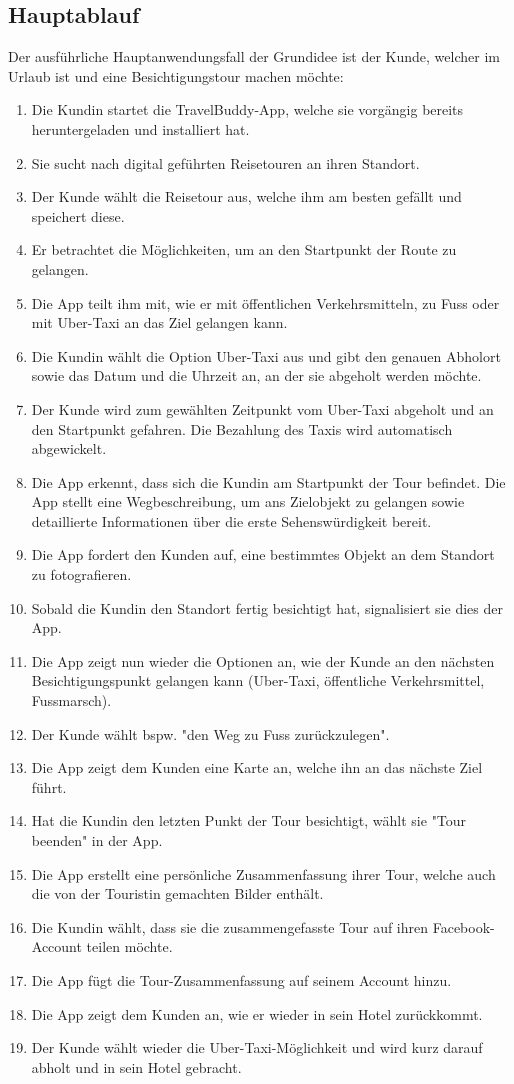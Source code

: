 \subsection{Hauptablauf}\label{Hauptablauf}
Der ausführliche Hauptanwendungsfall der Grundidee ist der Kunde, welcher im Urlaub ist und eine Besichtigungstour machen möchte:
\begin{enumerate}
\item Die Kundin startet die TravelBuddy-App, welche sie vorgängig bereits heruntergeladen und installiert hat.
\item Sie sucht nach digital geführten Reisetouren an ihren Standort.
\item Der Kunde wählt die Reisetour aus, welche ihm am besten gefällt und speichert diese.
\item Er betrachtet die Möglichkeiten, um an den Startpunkt der Route zu gelangen.
\item Die App teilt ihm mit, wie er mit öffentlichen Verkehrsmitteln, zu Fuss oder mit Uber-Taxi an das Ziel gelangen kann.
\item Die Kundin wählt die Option Uber-Taxi aus und gibt den genauen Abholort sowie das Datum und die Uhrzeit an, an der sie abgeholt werden möchte.
\item Der Kunde wird zum gewählten Zeitpunkt vom Uber-Taxi abgeholt und an den Startpunkt gefahren. Die Bezahlung des Taxis wird automatisch abgewickelt.
\item Die App erkennt, dass sich die Kundin am Startpunkt der Tour befindet. Die App stellt eine Wegbeschreibung, um ans Zielobjekt zu gelangen sowie detaillierte Informationen über die erste Sehenswürdigkeit bereit.
\item Die App fordert den Kunden auf, eine bestimmtes Objekt an dem Standort zu fotografieren.
\item Sobald die Kundin den Standort fertig besichtigt hat, signalisiert sie dies der App.
\item Die App zeigt nun wieder die Optionen an, wie der Kunde an den nächsten Besichtigungspunkt gelangen kann (Uber-Taxi, öffentliche Verkehrsmittel, Fussmarsch).
\item Der Kunde wählt bspw. "den Weg zu Fuss zurückzulegen".
\item Die App zeigt dem Kunden eine Karte an, welche ihn an das nächste Ziel führt.
\item Hat die Kundin den letzten Punkt der Tour besichtigt, wählt sie "Tour beenden" in der App.
\item Die App erstellt eine persönliche Zusammenfassung ihrer Tour, welche auch die von der Touristin gemachten Bilder enthält.
\item Die Kundin wählt, dass sie die zusammengefasste Tour auf ihren Facebook-Account teilen möchte.
\item Die App fügt die Tour-Zusammenfassung auf seinem Account hinzu.
\item Die App zeigt dem Kunden an, wie er wieder in sein Hotel zurückkommt.
\item Der Kunde wählt wieder die Uber-Taxi-Möglichkeit und wird kurz darauf abholt und in sein Hotel gebracht.
\end{enumerate}


